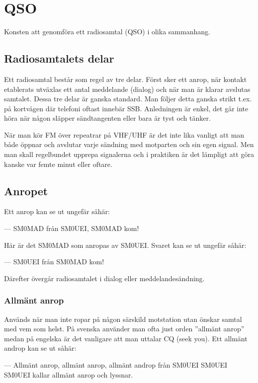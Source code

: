 \section{QSO}

Konsten att genomföra ett radiosamtal (QSO) i olika sammanhang.

\subsection{Radiosamtalets delar}

Ett radiosamtal består som regel av tre delar. Först sker ett anrop, när kontakt etablerats utväxlas ett antal meddelande (dialog) och när man är klarar avslutas samtalet. Dessa tre delar är ganska standard. Man följer detta ganska strikt t.ex. på kortvågen där telefoni oftast innebär SSB. Anledningen är enkel, det går inte höra när någon släpper sändtangenten eller bara är tyst och tänker.

När man kör FM över repeatrar på VHF/UHF är det inte lika vanligt att man både öppnar och avslutar varje sändning med motparten och sin egen signal. Men man skall regelbundet upprepa signalerna och i praktiken är det lämpligt att göra kanske var femte minut eller oftare.

\subsection{Anropet}

Ett anrop kan se ut ungefär såhär:

--- SM0MAD från SM0UEI, SM0MAD kom!

Här är det SM0MAD som anropas av SM0UEI. Svaret kan se ut ungefär såhär:

--- SM0UEI från SM0MAD kom!

Därefter övergår radiosamtalet i dialog eller meddelandesändning.

\subsubsection{Allmänt anrop} 

Används när man inte ropar på någon särskild motstation utan önskar samtal med vem som helst. På svenska använder man ofta just orden ''allmänt anrop'' medan på engelska är det vanligare att man uttalar CQ (seek you). Ett allmänt androp kan se ut såhär:

--- Allmänt anrop, allmänt anrop, allmänt androp från SM0UEI SM0UEI SM0UEI kallar allmänt anrop och lyssnar.

